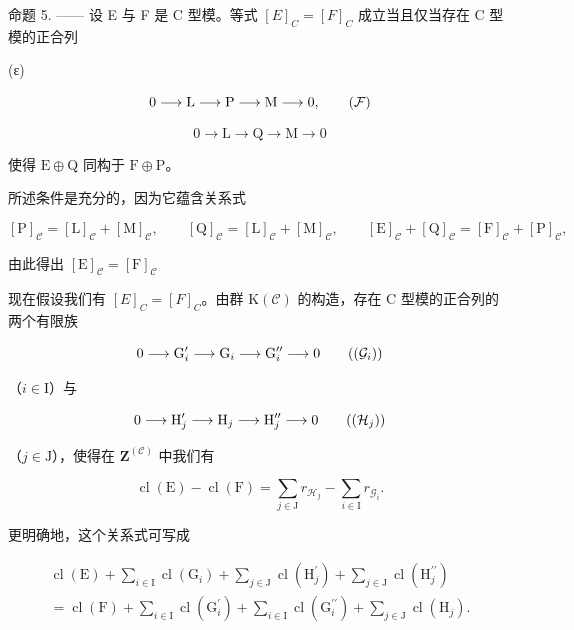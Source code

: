 命题 5. —— 设 E 与 F 是 C 型模。等式 \([E]_{C} = [F]_{C}\) 成立当且仅当存在 C 型模的正合列

(ε)

\[
0 \longrightarrow \mathrm{L} \longrightarrow \mathrm{P} \longrightarrow \mathrm{M} \longrightarrow 0,\tag{\( \mathcal{F} \)}
\]

\[
0 \longrightarrow \mathrm{L} \longrightarrow \mathrm{Q} \longrightarrow \mathrm{M} \longrightarrow 0
\]

使得 \(\mathrm{E} \oplus \mathrm{Q}\) 同构于 \(\mathrm{F} \oplus \mathrm{P}\)。

所述条件是充分的，因为它蕴含关系式

\[
[ \mathrm{P} ] _ {\mathcal {C}} = [ \mathrm{L} ] _ {\mathcal {C}} + [ \mathrm{M} ] _ {\mathcal {C}}, \qquad [ \mathrm{Q} ] _ {\mathcal {C}} = [ \mathrm{L} ] _ {\mathcal {C}} + [ \mathrm{M} ] _ {\mathcal {C}}, \qquad [ \mathrm{E} ] _ {\mathcal {C}} + [ \mathrm{Q} ] _ {\mathcal {C}} = [ \mathrm{F} ] _ {\mathcal {C}} + [ \mathrm{P} ] _ {\mathcal {C}},
\]

由此得出 \([\mathrm{E}]_{\mathcal{C}} = [\mathrm{F}]_{\mathcal{C}}\)

现在假设我们有 \([E]_{C} = [F]_{C}\)。由群 \(\mathrm{K}(\mathcal{C})\) 的构造，存在 C 型模的正合列的两个有限族

\[
0 \longrightarrow \mathrm{G} _ {i} ^ {\prime} \longrightarrow \mathrm{G} _ {i} \longrightarrow \mathrm{G} _ {i} ^ {\prime \prime} \longrightarrow 0\tag{\((\mathcal{G}_i)\)}
\]

（\(i\in \mathrm{I}\)）与

\[
0 \longrightarrow \mathrm{H} _ {j} ^ {\prime} \longrightarrow \mathrm{H} _ {j} \longrightarrow \mathrm{H} _ {j} ^ {\prime \prime} \longrightarrow 0\tag{\((\mathcal{H}_j)\)}
\]

（\(j\in \mathrm{J}\)），使得在 \(\mathbf{Z}^{(\mathcal{C})}\) 中我们有

\[
\operatorname{cl} (\mathrm{E}) - \operatorname{cl} (\mathrm{F}) = \sum_ {j \in \mathrm{J}} r _ {\mathcal {H} _ {j}} - \sum_ {i \in \mathrm{I}} r _ {\mathcal {G} _ {i}}.
\]

更明确地，这个关系式可写成

\[
\begin{array}{c} \operatorname{cl} (\mathrm{E}) + \sum_ {i \in \mathrm{I}} \operatorname{cl} (\mathrm{G} _ {i}) + \sum_ {j \in \mathrm{J}} \operatorname{cl} (\mathrm{H} _ {j} ^ {\prime}) + \sum_ {j \in \mathrm{J}} \operatorname{cl} (\mathrm{H} _ {j} ^ {\prime \prime}) \\ = \operatorname{cl} (\mathrm{F}) + \sum_ {i \in \mathrm{I}} \operatorname{cl} (\mathrm{G} _ {i} ^ {\prime}) + \sum_ {i \in \mathrm{I}} \operatorname{cl} (\mathrm{G} _ {i} ^ {\prime \prime}) + \sum_ {j \in \mathrm{J}} \operatorname{cl} (\mathrm{H} _ {j}). \end{array}\tag{7}
\]

